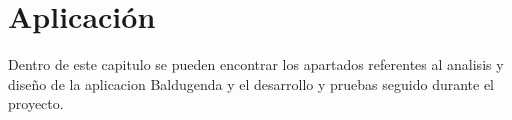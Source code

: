 \chapter{Aplicación}
\label{ch:aplicación}


Dentro de este capitulo se pueden encontrar los apartados referentes al analisis y diseño de la aplicacion Baldugenda y el desarrollo y pruebas seguido durante el proyecto.


\newpage

























